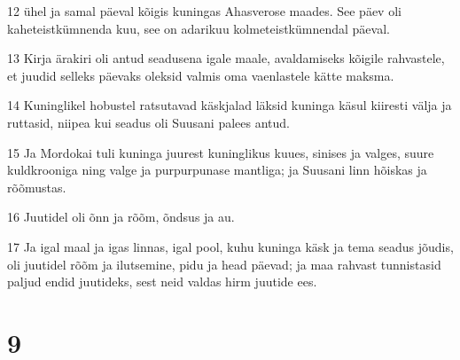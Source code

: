 \par 12 ühel ja samal päeval kõigis kuningas Ahasverose maades. See päev oli kaheteistkümnenda kuu, see on adarikuu kolmeteistkümnendal päeval.
\par 13 Kirja ärakiri oli antud seadusena igale maale, avaldamiseks kõigile rahvastele, et juudid selleks päevaks oleksid valmis oma vaenlastele kätte maksma.
\par 14 Kuninglikel hobustel ratsutavad käskjalad läksid kuninga käsul kiiresti välja ja ruttasid, niipea kui seadus oli Suusani palees antud.
\par 15 Ja Mordokai tuli kuninga juurest kuninglikus kuues, sinises ja valges, suure kuldkrooniga ning valge ja purpurpunase mantliga; ja Suusani linn hõiskas ja rõõmustas.
\par 16 Juutidel oli õnn ja rõõm, õndsus ja au.
\par 17 Ja igal maal ja igas linnas, igal pool, kuhu kuninga käsk ja tema seadus jõudis, oli juutidel rõõm ja ilutsemine, pidu ja head päevad; ja maa rahvast tunnistasid paljud endid juutideks, sest neid valdas hirm juutide ees.

\chapter{9}

